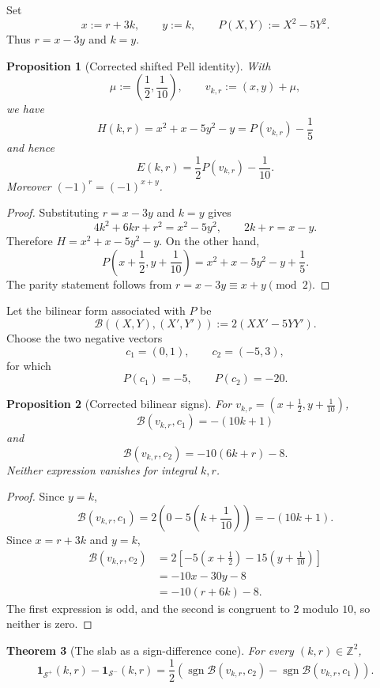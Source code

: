 \documentclass[12pt]{amsart}
\newtheorem{theorem}{Theorem}[section]
\newtheorem{proposition}[theorem]{Proposition}
\theoremstyle{definition}
\theoremstyle{remark}
\DeclareMathOperator{\sgn}{sgn}
\newcommand{\ZZ}{\mathbb{Z}}
\newcommand{\Splus}{\mathcal{S}^{+}}
\newcommand{\Sminus}{\mathcal{S}^{-}}
\begin{document}
Set
\[
  x:=r+3k,\qquad y:=k,
  \qquad P(X,Y):=X^2-5Y^2.
\]
Thus $r=x-3y$ and $k=y$.

\begin{proposition}[Corrected shifted Pell identity]\label{prop:pell-shift}
With
\[
  \mu:=\left(\frac12,\frac1{10}\right),
  \qquad v_{k,r}:=(x,y)+\mu,
\]
we have
\[
  H(k,r)=x^2+x-5y^2-y=P(v_{k,r})-\frac15
\]
and hence
\[
  E(k,r)=\frac12P(v_{k,r})-\frac1{10}.
\]
Moreover $(-1)^r=(-1)^{x+y}$.
\end{proposition}

\begin{proof}
Substituting $r=x-3y$ and $k=y$ gives
\[
  4k^2+6kr+r^2=x^2-5y^2,
  \qquad 2k+r=x-y.
\]
Therefore $H=x^2+x-5y^2-y$.  On the other hand,
\[
  P\left(x+\frac12,y+\frac1{10}\right)
  =x^2+x-5y^2-y+\frac15.
\]
The parity statement follows from $r=x-3y\equiv x+y\pmod2$.
\end{proof}

Let the bilinear form associated with $P$ be
\[
  \mathcal B((X,Y),(X',Y')):=2(XX'-5YY').
\]
Choose the two negative vectors
\[
  c_1=(0,1),\qquad c_2=(-5,3),
\]
for which
\[
  P(c_1)=-5,\qquad P(c_2)=-20.
\]

\begin{proposition}[Corrected bilinear signs]\label{prop:bilinear}
For $v_{k,r}=(x+\tfrac12,y+\tfrac1{10})$,
\[
  \mathcal B(v_{k,r},c_1)=-(10k+1)
\]
and
\[
  \mathcal B(v_{k,r},c_2)=-10(6k+r)-8.
\]
Neither expression vanishes for integral $k,r$.
\end{proposition}

\begin{proof}
Since $y=k$,
\[
  \mathcal B(v_{k,r},c_1)
  =2\left(0-5\left(k+\frac1{10}\right)\right)
  =-(10k+1).
\]
Since $x=r+3k$ and $y=k$,
\begin{align*}
  \mathcal B(v_{k,r},c_2)
  &=2\left[-5\left(x+\frac12\right)
       -15\left(y+\frac1{10}\right)\right]\\
  &=-10x-30y-8\\
  &=-10(r+6k)-8.
\end{align*}
The first expression is odd, and the second is congruent to $2$ modulo
$10$, so neither is zero.
\end{proof}

\begin{theorem}[The slab as a sign-difference cone]
\label{thm:sign-cone}
For every $(k,r)\in\ZZ^2$,
\[
  \mathbf 1_{\Splus}(k,r)-\mathbf 1_{\Sminus}(k,r)
  =\frac12\left(
    \sgn\mathcal B(v_{k,r},c_2)
    -\sgn\mathcal B(v_{k,r},c_1)
  \right).
\]
\end{theorem}
\end{document}
